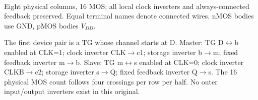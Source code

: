 \documentclass[10pt]{article}
\newcommand{\mos}[4]{\begin{scope}[shift={(#1,#2)}]
\draw (0,.24)--(0,-.24);\draw (0,.20)--(.25,.20)--(.25,.5);
\draw (0,-.20)--(.25,-.20)--(.25,-.5);\draw (-.16,.23)--(-.16,-.23);
\ifnum#4=1\draw (-.26,0) circle (.06);\draw (-.75,0)--(-.32,0);\else\draw (-.75,0)--(-.16,0);\fi
\node[anchor=east,font=\scriptsize] at (-.76,0) {$#3$};\end{scope}}
\begin{document}
\begin{center}
\\\small Eight physical columns, 16 MOS; all local clock inverters and always-connected feedback preserved. Equal terminal names denote connected wires. nMOS bodies use GND, pMOS bodies $V_{DD}$.\end{center}
The first device pair is a TG whose channel starts at D. Master: TG D$\leftrightarrow$b enabled at CLK=1; clock inverter CLK$\to$c1; storage inverter b$\to$m; fixed feedback inverter m$\to$b. Slave: TG m$\leftrightarrow$s enabled at CLK=0; clock inverter CLKB$\to$c2; storage inverter s$\to$Q; fixed feedback inverter Q$\to$s. The 16 physical MOS count follows four crossings per row per half. No outer input/output inverters exist in this original.
\end{document}
